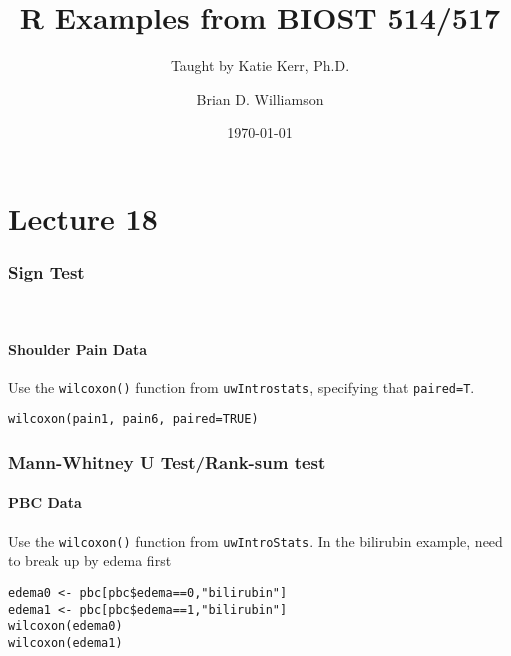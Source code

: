 \documentclass[pdf]{beamer}
\title{R Examples from BIOST 514/517}
\subtitle{Taught by Katie Kerr, Ph.D.}
\author{Brian D. Williamson}
\institute{University of Washington \\ Department of Biostatistics}
\date{\today}
\begin{document}
\begin{frame}
\titlepage
\end{frame}

\section{Lecture 18}
\begin{frame}[fragile]
\frametitle{Sign Test}\
\framesubtitle{Shoulder Pain Data}
Use the \texttt{wilcoxon()} function from \texttt{uwIntrostats}, specifying that \texttt{paired=T}.
\begin{verbatim}
wilcoxon(pain1, pain6, paired=TRUE)
\end{verbatim} 
\end{frame}

\begin{frame}[fragile]
\frametitle{Mann-Whitney U Test/Rank-sum test}
\framesubtitle{PBC Data}
Use the \texttt{wilcoxon()} function from \texttt{uwIntroStats}. In the bilirubin example, need to break up by edema first
\begin{verbatim}
edema0 <- pbc[pbc$edema==0,"bilirubin"]
edema1 <- pbc[pbc$edema==1,"bilirubin"]
wilcoxon(edema0)
wilcoxon(edema1)
\end{verbatim}
\end{frame}
\end{document}
